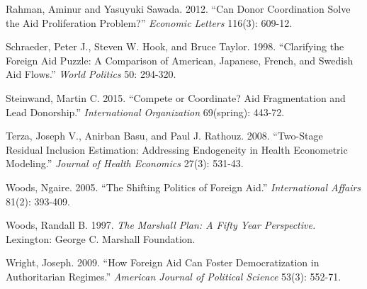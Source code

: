 \documentclass[12pt,]{article}
\begin{document}
Rahman, Aminur and Yasuyuki Sawada. 2012. ``Can Donor Coordination Solve
the Aid Proliferation Problem?'' \emph{Economic Letters} 116(3): 609-12.

Schraeder, Peter J., Steven W. Hook, and Bruce Taylor. 1998.
``Clarifying the Foreign Aid Puzzle: A Comparison of American, Japanese,
French, and Swedish Aid Flows.'' \emph{World Politics} 50: 294-320.

Steinwand, Martin C. 2015. ``Compete or Coordinate? Aid Fragmentation
and Lead Donorship.'' \emph{International Organization} 69(spring):
443-72.

Terza, Joseph V., Anirban Basu, and Paul J. Rathouz. 2008. ``Two-Stage
Residual Inclusion Estimation: Addressing Endogeneity in Health
Econometric Modeling.'' \emph{Journal of Health Economics} 27(3):
531-43.

Woods, Ngaire. 2005. ``The Shifting Politics of Foreign Aid.''
\emph{International Affairs} 81(2): 393-409.

Woods, Randall B. 1997. \emph{The Marshall Plan: A Fifty Year
Perspective.} Lexington: George C. Marshall Foundation.

Wright, Joseph. 2009. ``How Foreign Aid Can Foster Democratization in
Authoritarian Regimes.'' \emph{American Journal of Political Science}
53(3): 552-71.





\newpage
\singlespacing 
\end{document}

